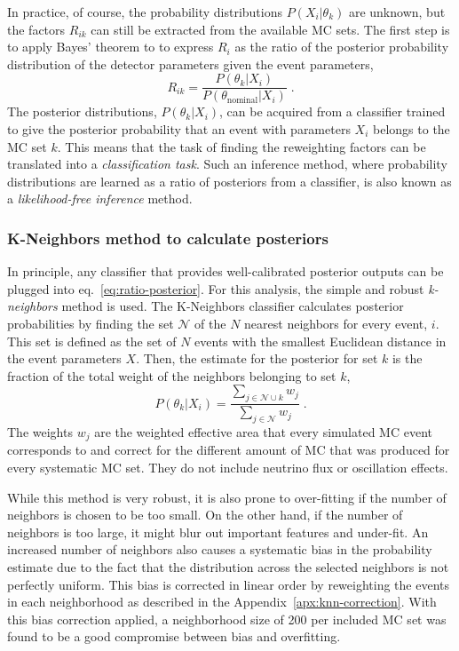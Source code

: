 In practice, of course, the probability distributions $P(X_i|\theta_k)$ are unknown, but the factors $R_{ik}$  can still be extracted from the available MC sets.
The first step is to apply Bayes' theorem to  to express $R_i$ as the ratio of the posterior probability distribution of the detector parameters given the event parameters,
\begin{equation}
    R_{ik} = \frac{P(\theta_k|X_i)}{P(\theta_\mathrm{nominal}|X_i)}\;. \label{eq:ratio-posterior}
\end{equation}
The posterior distributions, $P(\theta_k|X_i)$, can be acquired from a classifier trained to give the posterior probability that an event with parameters $X_i$ belongs to the MC set $k$. This means that the task of finding the reweighting factors can be translated into a \emph{classification task}. Such an inference method, where probability distributions are learned as a ratio of posteriors from a classifier, is also known as a \emph{likelihood-free inference} method.

\subsubsection{K-Neighbors method to calculate posteriors}
In principle, any classifier that provides well-calibrated posterior outputs can be plugged into eq.~\ref{eq:ratio-posterior}. For this analysis, the simple and robust \emph{k-neighbors} method is used.
The K-Neighbors classifier calculates posterior probabilities by finding the set $\mathcal{N}$ of the $N$ nearest neighbors for every event, $i$. This set is defined as the set of $N$ events with the smallest Euclidean distance in the event parameters $X$.   Then, the estimate for the posterior for set $k$ is the fraction of the total weight of the neighbors belonging to set $k$,
\begin{equation}
    P(\theta_k|X_i) = \frac{\sum_{j\in{\mathcal{N}\cup k}} w_j }{\sum_{j\in{\mathcal{N}}} w_j}\;. \label{eq:posterior-knn}
\end{equation}
The weights $w_j$ are the weighted effective area that every simulated MC event corresponds to and correct for the different amount of MC that was produced for every systematic MC set. They do not include neutrino flux or oscillation effects.

While this method is very robust, it is also prone to over-fitting if the number of neighbors is chosen to be too small. On the other hand, if the number of neighbors is too large, it might blur out important features and under-fit. An increased number of neighbors also causes a systematic bias in the probability estimate due to the fact that the distribution across the selected neighbors is not perfectly uniform. This bias is corrected in linear order by reweighting the events in each neighborhood as described in the Appendix~\ref{apx:knn-correction}. With this bias correction applied, a neighborhood size of 200 per included MC set was found to be a good compromise between bias and overfitting.

